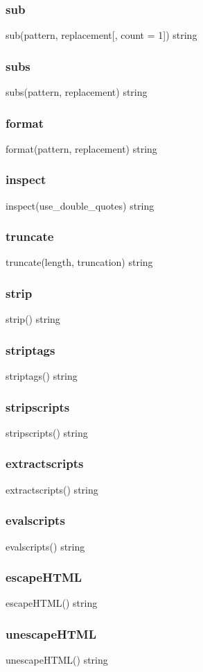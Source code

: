 {{\subsubsection*{sub}
sub(pattern, replacement[, count = 1]) \rightarrow string
\subsubsection*{subs}
subs(pattern, replacement) \rightarrow string
\subsubsection*{format}
format(pattern, replacement) \rightarrow string
\subsubsection*{inspect} 
inspect(use_double_quotes) \rightarrow string
\subsubsection*{truncate}
truncate(length, truncation) \rightarrow string
\subsubsection*{strip}
strip() \rightarrow string
\subsubsection*{striptags}
striptags() \rightarrow string
\subsubsection*{stripscripts}
stripscripts() \rightarrow string
\subsubsection*{extractscripts}
extractscripts() \rightarrow string
\subsubsection*{evalscripts}
evalscripts() \rightarrow string
\subsubsection*{escapeHTML}
escapeHTML() \rightarrow string
\subsubsection*{unescapeHTML}
unescapeHTML() \rightarrow string
}}
